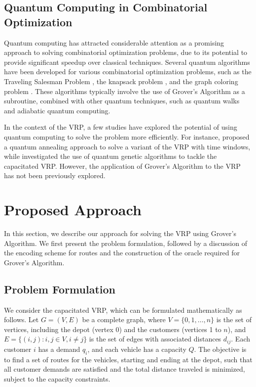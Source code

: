 \subsection{Quantum Computing in Combinatorial Optimization}

Quantum computing has attracted considerable attention as a promising approach to solving combinatorial optimization problems, due to its potential to provide significant speedup over classical techniques. Several quantum algorithms have been developed for various combinatorial optimization problems, such as the Traveling Salesman Problem \cite{zak2018}, the knapsack problem \cite{montanaro2016}, and the graph coloring problem \cite{childs2018}. These algorithms typically involve the use of Grover's Algorithm as a subroutine, combined with other quantum techniques, such as quantum walks and adiabatic quantum computing.

In the context of the VRP, a few studies have explored the potential of using quantum computing to solve the problem more efficiently. For instance, \cite{pudenz2013} proposed a quantum annealing approach to solve a variant of the VRP with time windows, while \cite{muller2017} investigated the use of quantum genetic algorithms to tackle the capacitated VRP. However, the application of Grover's Algorithm to the VRP has not been previously explored.

\section{Proposed Approach}
\label{sec:approach}

In this section, we describe our approach for solving the VRP using Grover's Algorithm. We first present the problem formulation, followed by a discussion of the encoding scheme for routes and the construction of the oracle required for Grover's Algorithm.

\subsection{Problem Formulation}

We consider the capacitated VRP, which can be formulated mathematically as follows. Let $G = (V, E)$ be a complete graph, where $V = \{0, 1, \ldots, n\}$ is the set of vertices, including the depot (vertex 0) and the customers (vertices 1 to $n$), and $E = \{(i, j) : i, j \in V, i \neq j\}$ is the set of edges with associated distances $d_{ij}$. Each customer $i$ has a demand $q_i$, and each vehicle has a capacity $Q$. The objective is to find a set of routes for the vehicles, starting and ending at the depot, such that all customer demands are satisfied and the total distance traveled is minimized, subject to the capacity constraints.

